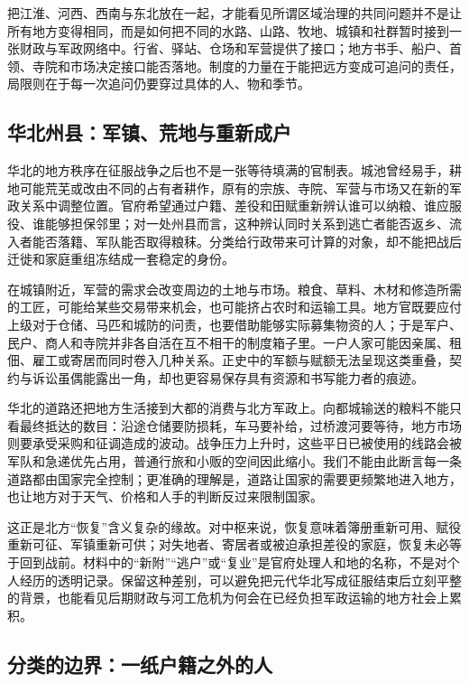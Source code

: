 把江淮、河西、西南与东北放在一起，才能看见所谓区域治理的共同问题并不是让所有地方变得相同，而是如何把不同的水路、山路、牧地、城镇和社群暂时接到一张财政与军政网络中。行省、驿站、仓场和军营提供了接口；地方书手、船户、首领、寺院和市场决定接口能否落地。制度的力量在于能把远方变成可追问的责任，局限则在于每一次追问仍要穿过具体的人、物和季节。

\subsection{华北州县：军镇、荒地与重新成户}

华北的地方秩序在征服战争之后也不是一张等待填满的官制表。城池曾经易手，耕地可能荒芜或改由不同的占有者耕作，原有的宗族、寺院、军营与市场又在新的军政关系中调整位置。官府希望通过户籍、差役和田赋重新辨认谁可以纳粮、谁应服役、谁能够担保邻里；对一处州县而言，这种辨认同时关系到逃亡者能否返乡、流入者能否落籍、军队能否取得粮秣。分类给行政带来可计算的对象，却不能把战后迁徙和家庭重组冻结成一套稳定的身份。

在城镇附近，军营的需求会改变周边的土地与市场。粮食、草料、木材和修造所需的工匠，可能给某些交易带来机会，也可能挤占农时和运输工具。地方官既要应付上级对于仓储、马匹和城防的问责，也要借助能够实际募集物资的人；于是军户、民户、商人和寺院并非各自活在互不相干的制度箱子里。一户人家可能因亲属、租佃、雇工或寄居而同时卷入几种关系。正史中的军额与赋额无法呈现这类重叠，契约与诉讼虽偶能露出一角，却也更容易保存具有资源和书写能力者的痕迹。

华北的道路还把地方生活接到大都的消费与北方军政上。向都城输送的粮料不能只看最终抵达的数目：沿途仓储要防损耗，车马要补给，过桥渡河要等待，地方市场则要承受采购和征调造成的波动。战争压力上升时，这些平日已被使用的线路会被军队和急递优先占用，普通行旅和小贩的空间因此缩小。我们不能由此断言每一条道路都由国家完全控制；更准确的理解是，道路让国家的需要更频繁地进入地方，也让地方对于天气、价格和人手的判断反过来限制国家。

这正是北方“恢复”含义复杂的缘故。对中枢来说，恢复意味着簿册重新可用、赋役重新可征、军镇重新可供；对失地者、寄居者或被迫承担差役的家庭，恢复未必等于回到战前。材料中的“新附”“逃户”或“复业”是官府处理人和地的名称，不是对个人经历的透明记录。保留这种差别，可以避免把元代华北写成征服结束后立刻平整的背景，也能看见后期财政与河工危机为何会在已经负担军政运输的地方社会上累积。

\subsection{分类的边界：一纸户籍之外的人}

